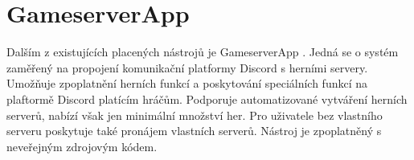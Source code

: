 \section{GameserverApp}

Dalším z existujících placených nástrojů je GameserverApp \cite{gameserverapp}. Jedná se o systém zaměřený na propojení komunikační platformy Discord s herními servery.
Umožňuje zpoplatnění herních funkcí a poskytování speciálních funkcí na plaftormě Discord platícím hráčům. Podporuje automatizované vytváření herních serverů, nabízí však jen
minimální množství her. Pro uživatele bez vlastního serveru poskytuje také pronájem vlastních serverů. Nástroj je zpoplatněný s neveřejným zdrojovým kódem.

